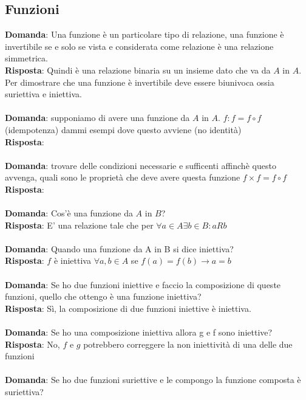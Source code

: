 \documentclass{article}
\begin{document}
\subsection{Funzioni}
\textbf{Domanda}: Una funzione è un particolare tipo di relazione, una funzione è invertibile se e solo se vista e considerata come relazione è una relazione simmetrica. \\
\textbf{Risposta}: Quindi è una relazione binaria su un insieme dato che va da $A$ in $A$. Per dimostrare che una funzione è invertibile deve essere biunivoca ossia suriettiva e iniettiva. \\ \\
\textbf{Domanda}: supponiamo di avere una funzione da $A$ in $A$. $f: f = f \circ f$ (idempotenza) dammi esempi dove questo avviene (no identità) \\
\textbf{Risposta}: \\ \\
\textbf{Domanda}: trovare delle condizioni necessarie e sufficenti affinchè questo avvenga, quali sono le proprietà che deve avere questa funzione $f \times f = f \circ f$ \\
\textbf{Risposta}: \\ \\
\textbf{Domanda}: Cos'è una funzione da $A$ in $B$? \\
\textbf{Risposta}: E' una relazione tale che per $ \forall a \in A \exists b \in B: a R b$ \\ \\
\textbf{Domanda}: Quando una funzione da A in B si dice iniettiva? \\
\textbf{Risposta}: $f$ è iniettiva $ \forall a,b \in A$ se $f(a) = f(b) \to a = b$ \\ \\
\textbf{Domanda}: Se ho due funzioni iniettive e faccio la composizione di queste funzioni, quello che ottengo è una funzione iniettiva? \\
\textbf{Risposta}: Sì, la composizione di due funzioni iniettive è iniettiva. \\ \\
\textbf{Domanda}: Se ho una composizione iniettiva allora g e f sono iniettive? \\
\textbf{Risposta}: No, $f$ e $g$ potrebbero correggere la non iniettività di una delle due funzioni\\ \\
\textbf{Domanda}: Se ho due funzioni suriettive e le compongo la funzione composta è suriettiva? \\
\end{document}
